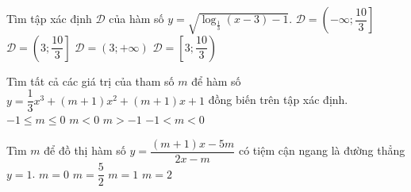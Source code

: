 \begin{ex}%
Tìm tập xác định $\mathscr{D}$ của hàm số $y=\sqrt{\log_{\frac{1}{3}}(x-3)-1}$.
\choice
{$\mathscr{D}=\left(-\infty;\dfrac{10}{3}\right]$}
{\True $\mathscr{D}=\left(3;\dfrac{10}{3}\right]$}
{$\mathscr{D}=\left(3;+\infty\right)$}
{$\mathscr{D}=\left[3;\dfrac{10}{3}\right)$}
\end{ex}

\begin{ex}%
Tìm tất cả các giá trị của tham số $m$ để hàm số $y=\dfrac{1}{3}x^3+(m+1)x^2+(m+1)x+1$ đồng biến trên tập xác định.
\choice
{\True $-1\le m\le 0$}
{$m<0$}
{$m>-1$}
{$-1<m<0$}
\end{ex}

\begin{ex}%
Tìm $m$ để đồ thị hàm số $y=\dfrac{(m+1)x-5m}{2x-m}$ có tiệm cận ngang là đường thẳng $y=1$.
\choice
{$m=0$}
{$m=\dfrac{5}{2}$}
{\True $m=1$}
{$m=2$}
\end{ex}

